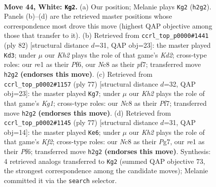 \documentclass[11pt]{article}
\begin{document}
\clearpage

\begin{figure}[p]\centering
\begin{subfigure}{0.46\textwidth}\centering
\resizebox{\linewidth}{!}{%
\newchessgame
\chessboard[
  setfen={2N4k/1p4b1/6p1/5p1p/Pr6/R5PP/5P1K/4r3 w - - 3 44},
  showmover=false,
  pgfstyle=straightmove, color=movearrow, markmove={h2-g2}
]}
\caption{}
\end{subfigure}\hfill
\begin{subfigure}{0.46\textwidth}\centering
\resizebox{\linewidth}{!}{%
\newchessgame
\chessboard[
  setfen={8/5p2/5P2/p1pk3p/7r/PP3R1P/2PK4/8 w - - 0 42},
  showmover=false,
  pgfstyle=straightmove, color=movearrow, markmove={d2-d3}
]}
\caption{}
\end{subfigure}
\\[4pt]
\begin{subfigure}{0.46\textwidth}\centering
\resizebox{\linewidth}{!}{%
\newchessgame
\chessboard[
  setfen={6k1/5p2/4r1p1/2R5/1rp1P2p/5P1P/6P1/R6K b - - 1 39},
  showmover=false,
  pgfstyle=straightmove, color=movearrow, markmove={g8-g7}
]}
\caption{}
\end{subfigure}\hfill
\begin{subfigure}{0.46\textwidth}\centering
\resizebox{\linewidth}{!}{%
\newchessgame
\chessboard[
  setfen={8/5kp1/ppr2p2/7p/PR6/4P1PP/1P2K3/8 b - - 2 39},
  showmover=false,
  pgfstyle=straightmove, color=movearrow, markmove={f7-e6}
]}
\caption{}
\end{subfigure}
\caption{\textbf{Move 44, White: \texttt{Kg2}.} (a) Our position; Melanie plays \texttt{Kg2} (\texttt{h2g2}). Panels (b)--(d) are the retrieved master positions whose correspondence most drove this move (highest QAP objective among those that transfer to it). (b) Retrieved from \texttt{ccrl\_top\_p0000\#1441} (ply 82) [structural distance $d$=31, QAP obj=23]: the master played \texttt{Kd3}; under $\mu$ our \emph{Kh2} plays the role of that game's \emph{Kd2}; cross-type roles: our \emph{r}e1 as their \emph{P}f6, our \emph{N}c8 as their \emph{p}f7; transferred move \texttt{h2g2} \textbf{(endorses this move)}. (c) Retrieved from \texttt{ccrl\_top\_p0002\#1157} (ply 77) [structural distance $d$=32, QAP obj=23]: the master played \texttt{Kg7}; under $\mu$ our \emph{Kh2} plays the role of that game's \emph{Kg1}; cross-type roles: our \emph{N}c8 as their \emph{P}f7; transferred move \texttt{h2g2} \textbf{(endorses this move)}. (d) Retrieved from \texttt{ccrl\_top\_p0002\#1145} (ply 77) [structural distance $d$=31, QAP obj=14]: the master played \texttt{Ke6}; under $\mu$ our \emph{Kh2} plays the role of that game's \emph{Kf2}; cross-type roles: our \emph{N}c8 as their \emph{P}g7, our \emph{r}e1 as their \emph{P}f6; transferred move \texttt{h2g2} \textbf{(endorses this move)}. Synthesis: 4 retrieved analogs transferred to \texttt{Kg2} (summed QAP objective 73, the strongest correspondence among the candidate moves); Melanie committed it via the \texttt{search} selector.}
\label{fig:thought-m86}
\end{figure}
\end{document}
